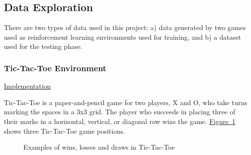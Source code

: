 \documentclass{article}
\newcommand{\GithubURL}[2]{
\noindent
\href{https://github.com/davidrobles/mlnd-capstone-code/blob/master/#1}{#2}
\break
}
\begin{document}
\subsection{Data Exploration}

There are two types of data used in this project: a) data generated by two games used as
reinforcement learning environments used for training, and b) a dataset used for the testing phase.

\subsubsection{Tic-Tac-Toe Environment}

\GithubURL{capstone/game/games/tictactoe.py}{Implementation}

Tic-Tac-Toe is a paper-and-pencil game for two players, X and O, who take turns marking the spaces
in a 3x3 grid. The player who succeeds in placing three of their marks in a horizontal, vertical, or
diagonal row wins the game. \hyperref[fig:tic-env]{Figure~\ref*{fig:tic-env}} shows three
Tic-Tac-Toe game positions.


\begin{figure}[!h]
    \centering
     \hspace{0.2in}
     \hspace{0.2in}
    \caption{Examples of wins, losses and draws in Tic-Tac-Toe}
    \label{fig:tic-env}
\end{figure}
\end{document}
